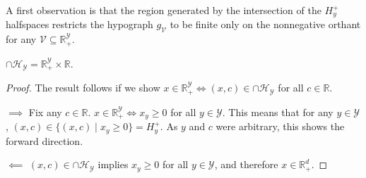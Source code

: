 \documentclass[twoside,11pt]{article}
\newcommand{\reals}{\mathbb{R}}
\renewcommand{\H}{\mathcal{H}}
\newcommand{\V}{\mathcal{V}}
\newcommand{\Y}{\mathcal{Y}}
\begin{document}
A first observation is that the region generated by the intersection of the $H^+_y$ halfspaces restricts the hypograph $g_\V$ to be finite only on the nonnegative orthant for any $\V \subseteq \reals^\Y_+$.
\begin{lemma}\label{lem:x-nonneg-orthant-iff-intersection-HY}
  $\cap \H_\Y = \reals^\Y_+ \times \reals$.
\end{lemma}
\begin{proof}
  The result follows if we show $x \in \reals^\Y_+ \iff (x,c) \in \cap \H_\Y$ for all $c \in \reals$.

  $\implies$
  Fix any $c \in \reals$.
  $x \in \reals^\Y_+ \iff x_y \geq 0$ for all $y \in \Y$.
  This means that for any $y \in \Y$, $(x,c) \in \{(x,c) \mid x_y \geq 0\} = H^+_y$.
  As $y$ and $c$ were arbitrary, this shows the forward direction.
  
  $\impliedby$
  $(x,c) \in \cap \H_\Y$ implies $x_y \geq 0$ for all $y \in \Y$, and therefore $x \in \reals^d_+$.	
\end{proof}
\end{document}
